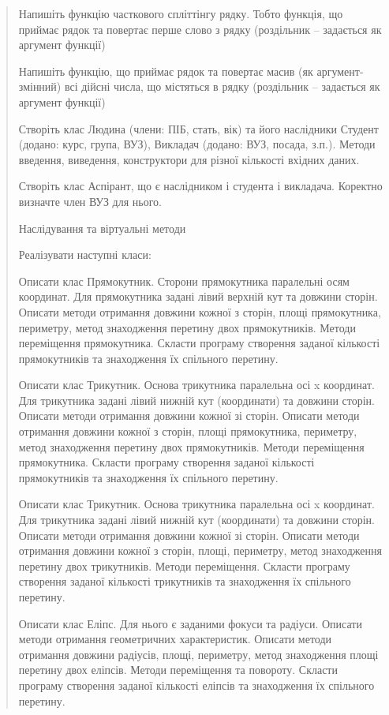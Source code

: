 \documentclass[]{article}
\begin{document}
\begin{quote}
\protect\hypertarget{_Hlk65951416}{}{}Напишіть функцію часткового
спліттінгу рядку. Тобто функція, що приймає рядок та повертає перше
слово з рядку (роздільник -- задається як аргумент функції)

Напишіть функцію, що приймає рядок та повертає масив (як
аргумент-змінний) всі дійсні числа, що містяться в рядку (роздільник --
задається як аргумент функції)

\protect\hypertarget{_Hlk65951597}{}{}Створіть клас Людина (члени: ПІБ,
стать, вік) та його наслідники Студент (додано: курс, група, ВУЗ),
Викладач (додано: ВУЗ, посада, з.п.). Методи введення, виведення,
конструктори для різної кількості вхідних даних.

Створіть клас Аспірант, що є наслідником і студента і викладача.
Коректно визначте член ВУЗ для нього.

Наслідування та віртуальні методи

\protect\hypertarget{_Hlk65951642}{}{}Реалізувати наступні класи:

Описати клас Прямокутник. Сторони прямокутника паралельні осям
координат. Для прямокутника задані лівий верхній кут та довжини сторін.
Описати методи отримання довжини кожної з сторін, площі прямокутника,
периметру, метод знаходження перетину двох прямокутників. Методи
переміщення прямокутника. Скласти програму створення заданої кількості
прямокутників та знаходження їх спільного перетину.

Описати клас Трикутник. Основа трикутника паралельна осі x координат.
Для трикутника задані лівий нижній кут (координати) та довжини сторін.
Описати методи отримання довжини кожної зі сторін. Описати методи
отримання довжини кожної з сторін, площі прямокутника, периметру, метод
знаходження перетину двох прямокутників. Методи переміщення
прямокутника. Скласти програму створення заданої кількості прямокутників
та знаходження їх спільного перетину.

Описати клас Трикутник. Основа трикутника паралельна осі x координат.
Для трикутника задані лівий нижній кут (координати) та довжини сторін.
Описати методи отримання довжини кожної зі сторін. Описати методи
отримання довжини кожної з сторін, площі, периметру, метод знаходження
перетину двох трикутників. Методи переміщення. Скласти програму
створення заданої кількості трикутників та знаходження їх спільного
перетину.

Описати клас Еліпс. Для нього є заданими фокуси та радіуси. Описати
методи отримання геометричних характеристик. Описати методи отримання
довжини радіусів, площі, периметру, метод знаходження площі перетину
двох еліпсів. Методи переміщення та повороту. Скласти програму створення
заданої кількості еліпсів та знаходження їх спільного перетину.


\end{quote}
\end{document}
